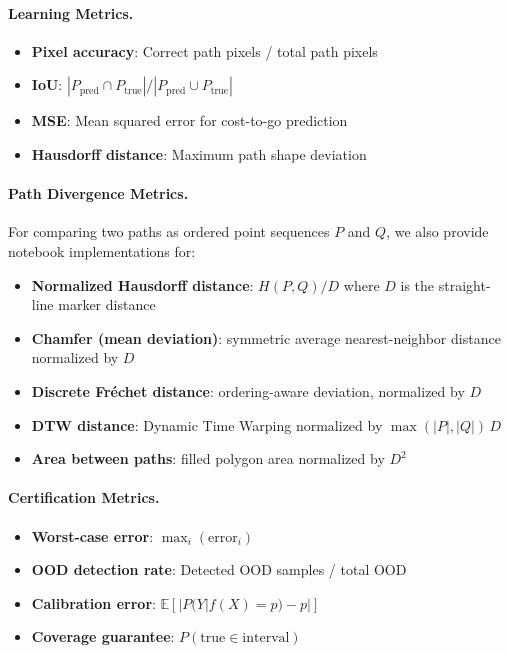 \documentclass{article}
\begin{document}
\paragraph{Learning Metrics.}
\begin{itemize}[noitemsep]
    \item \textbf{Pixel accuracy}: Correct path pixels / total path pixels
    \item \textbf{IoU}: $|P_{\text{pred}} \cap P_{\text{true}}| / |P_{\text{pred}} \cup P_{\text{true}}|$
    \item \textbf{MSE}: Mean squared error for cost-to-go prediction
    \item \textbf{Hausdorff distance}: Maximum path shape deviation
\end{itemize}

\paragraph{Path Divergence Metrics.}
For comparing two paths as ordered point sequences $P$ and $Q$, we also provide notebook implementations for:
\begin{itemize}[noitemsep]
    \item \textbf{Normalized Hausdorff distance}: $H(P,Q)/D$ where $D$ is the straight-line marker distance
    \item \textbf{Chamfer (mean deviation)}: symmetric average nearest-neighbor distance normalized by $D$
    \item \textbf{Discrete Fr\'{e}chet distance}: ordering-aware deviation, normalized by $D$
    \item \textbf{DTW distance}: Dynamic Time Warping normalized by $\max(|P|,|Q|)\,D$
    \item \textbf{Area between paths}: filled polygon area normalized by $D^2$
\end{itemize}

\paragraph{Certification Metrics.}
\begin{itemize}[noitemsep]
    \item \textbf{Worst-case error}: $\max_i(\text{error}_i)$
    \item \textbf{OOD detection rate}: Detected OOD samples / total OOD
    \item \textbf{Calibration error}: $\mathbb{E}[|P(Y|f(X)=p) - p|]$
    \item \textbf{Coverage guarantee}: $P(\text{true} \in \text{interval})$
\end{itemize}
\end{document}

